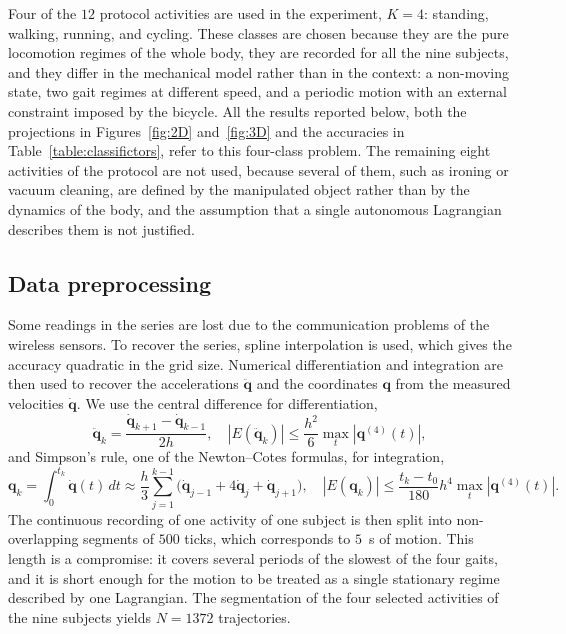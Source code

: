 \documentclass[sn-mathphys-num]{sn-jnl}
\theoremstyle{thmstylethree}
\theoremstyle{thmstyletwo}
\theoremstyle{thmstyleone}
\begin{document}
Four of the $12$ protocol activities are used in the experiment, $K = 4$: standing, walking, running, and cycling. These classes are chosen because they are the pure locomotion regimes of the whole body, they are recorded for all the nine subjects, and they differ in the mechanical model rather than in the context: a non-moving state, two gait regimes at different speed, and a periodic motion with an external constraint imposed by the bicycle. All the results reported below, both the projections in Figures~\ref{fig:2D} and~\ref{fig:3D} and the accuracies in Table~\ref{table:classifictors}, refer to this four-class problem. The remaining eight activities of the protocol are not used, because several of them, such as ironing or vacuum cleaning, are defined by the manipulated object rather than by the dynamics of the body, and the assumption that a single autonomous Lagrangian describes them is not justified.

\subsection{Data preprocessing}
Some readings in the series are lost due to the communication problems of the wireless sensors. To recover the series, spline interpolation is used, which gives the accuracy quadratic in the grid size. Numerical differentiation and integration are then used to recover the accelerations $\ddot{\mathbf{q}}$ and the coordinates $\mathbf{q}$ from the measured velocities $\dot{\mathbf{q}}$. We use the central difference for differentiation,
\[
\ddot{\mathbf{q}}_k =\frac{\dot{\mathbf{q}}_{k+1} - \dot{\mathbf{q}}_{k-1}}{2h},
\quad
\left|E(\ddot{\mathbf{q}}_k)\right|\le \frac{h^2}{6}\max_t \left|\mathbf{q}^{(4)}(t)\right|,
\]
and Simpson's rule, one of the Newton--Cotes formulas, for integration,
\[
\mathbf{q}_k = \int_{0}^{t_k}{\dot{\mathbf{q}}(t)\,dt}\approx\frac{h}{3}\sum_{j=1}^{k-1}{\Big(\dot{\mathbf{q}}_{j-1}+4\dot{\mathbf{q}}_j+\dot{\mathbf{q}}_{j+1}\Big)},
\quad
\left|E(\mathbf{q}_k)\right| \le \frac{t_k - t_0}{180}h^4\max_t\left|\mathbf{q}^{(4)}(t)\right|.
\]
The continuous recording of one activity of one subject is then split into non-overlapping segments of $500$ ticks, which corresponds to $5$~s of motion. This length is a compromise: it covers several periods of the slowest of the four gaits, and it is short enough for the motion to be treated as a single stationary regime described by one Lagrangian. The segmentation of the four selected activities of the nine subjects yields $N = 1372$ trajectories.
\end{document}
